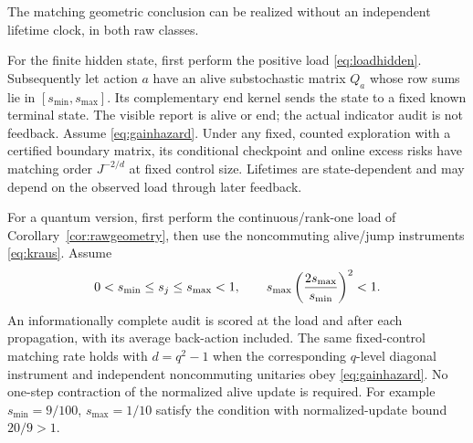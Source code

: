 \begin{proposition}\label{prop:endogenous}
The matching geometric conclusion can be realized without an independent lifetime clock, in both raw classes.

For the finite hidden state, first perform the positive load \eqref{eq:loadhidden}. Subsequently let action $a$ have an alive substochastic matrix $Q_a$ whose row sums lie in $[s_{\min},s_{\max}]$. Its complementary end kernel sends the state to a fixed known terminal state. The visible report is alive or end; the actual indicator audit is not feedback. Assume \eqref{eq:gainhazard}. Under any fixed, counted exploration with a certified boundary matrix, its conditional checkpoint and online excess risks have matching order $J^{-2/d}$ at fixed control size. Lifetimes are state-dependent and may depend on the observed load through later feedback.

For a quantum version, first perform the continuous/rank-one load of Corollary~\ref{cor:rawgeometry}, then use the noncommuting alive/jump instruments \eqref{eq:kraus}. Assume
\begin{equation}\label{eq:gainhazard}
 0<s_{\min}\le s_j\le s_{\max}<1,\qquad
 s_{\max}\left({2s_{\max}\over s_{\min}}\right)^2<1.
\end{equation}
An informationally complete audit is scored at the load and after each propagation, with its average back-action included. The same fixed-control matching rate holds with $d=q^2-1$ when the corresponding $q$-level diagonal instrument and independent noncommuting unitaries obey \eqref{eq:gainhazard}. No one-step contraction of the normalized alive update is required. For example $s_{\min}=9/100$, $s_{\max}=1/10$ satisfy the condition with normalized-update bound $20/9>1$.
\end{proposition}

